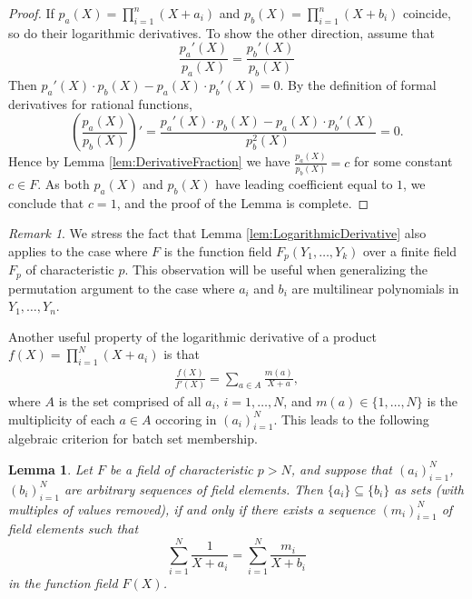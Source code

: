 \documentclass[11pt]{article}
\newtheorem{lem}[]{Lemma}
\theoremstyle{definition}
\theoremstyle{remark}
\newtheorem{rem}[thm]{Remark}
\begin{document}
\begin{proof}
If  $p_a(X) = \prod_{i=1}^n \left(X + a_i\right)$ and $p_b(X) = \prod_{i=1}^n \left(X + b_i\right)$
coincide, so do their logarithmic derivatives.
To show the other direction, assume that 
\[
\frac{p_a'(X)}{p_a(X)}  = \frac{p_b'(X)}{p_b(X)}
\]
Then $p_a'(X)\cdot p_b(X) - p_a(X)\cdot  p_b'(X) = 0$. 
By the definition of formal derivatives for rational functions,  
\[
\left(\frac{p_a(X)}{p_b(X)}\right)'  = \frac{p_a'(X)\cdot p_b(X) - p_a(X)\cdot  p_b'(X)} {p_b^2(X)} = 0.
\]
Hence by Lemma \ref{lem:DerivativeFraction} we have $\frac{p_a(X)}{p_b(X)} = c$ for some constant  $c \in F$.
As both $p_a(X)$ and $p_b(X)$ have leading coefficient equal to $1$, we conclude that $c =1$, and the proof of the Lemma is complete.
\end{proof}
\begin{rem}
\label{rem:LogarithmicDerivativeFunctionField}
We stress the fact that Lemma \ref{lem:LogarithmicDerivative} also applies to the case where $F$  is the function field $F_p(Y_1,\ldots, Y_k)$ over a finite field $F_p$ of characteristic $p$.
This observation will be useful when generalizing the permutation argument to the case where $a_i$ and $b_i$ are multilinear polynomials in $Y_1, \ldots, Y_n$.
\end{rem}

Another useful property of the logarithmic derivative of a product $f(X)=\prod_{i=1}^N (X + a_i)$ is that
\begin{align*}
\frac{f(X)}{f'(X)} = \sum_{a\in A} \frac{m(a)}{X + a},
\end{align*}
where $A$ is the set comprised of all $a_i$, $i=1,\ldots, N$,  and $m(a)\in \{1,\ldots, N\}$ is the multiplicity of each $a\in A$ occoring in $(a_i)_{i=1}^N$.
This leads to the following algebraic criterion for batch set membership.
\begin{lem}
\label{lem:SetInclusion}
Let $F$ be a field of characteristic $p>N$, and suppose that $(a_i)_{i=1}^N$, $(b_i)_{i=1}^N$ are arbitrary sequences of field elements.
Then $\{a_i \}\subseteq \{b_i\}$ as sets (with multiples of values removed), if and only if there exists a sequence $(m_i)_{i=1}^N$ of field elements such that
\begin{equation}
\label{e:fracs}
\sum_{i=1}^N \frac{1}{X + a_i} = \sum_{i=1}^N \frac{m_i}{X + b_i}  
\end{equation}
in the function field $F(X)$.
\end{lem}
\end{document}
